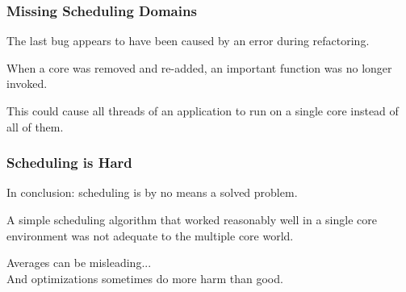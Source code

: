 \begin{frame}
\frametitle{Missing Scheduling Domains}

The last bug appears to have been caused by an error during refactoring. 

When a core was removed and re-added, an important function was no longer invoked.

This could cause all threads of an application to run on a single core instead of all of them. 

\end{frame}



\begin{frame}
\frametitle{Scheduling is Hard}

In conclusion: scheduling is by no means a solved problem. 

A simple scheduling algorithm that worked reasonably well in a single core environment was not adequate to the multiple core world. 

Averages can be misleading...\\
\quad And optimizations sometimes do more harm than good. 

\end{frame}



